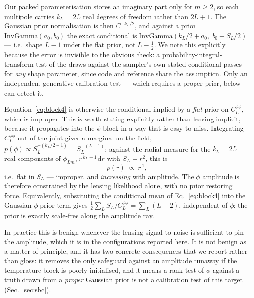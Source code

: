 \documentclass[twocolumn,superscriptaddress,aps,prl,floatfix]{revtex4-2}
\newcommand{\clpp}{C_L^{\phi\phi}}
\begin{document}
Our packed parameterisation stores an imaginary part only for $m \ge 2$, so
each multipole carries $k_L = 2L$ real degrees of freedom rather than $2L+1$.
The Gaussian prior normalisation is then $C^{-k_L/2}$, and against a prior
$\mathrm{InvGamma}(a_0, b_0)$ the exact conditional is
$\mathrm{InvGamma}(k_L/2 + a_0,\; b_0 + S_L/2)$ --- i.e.\ shape $L-1$ under the
flat prior, not $L-\tfrac12$. We note this explicitly because the error is
invisible to the obvious check: a probability-integral-transform test of the
draws against the sampler's own stated conditional passes for \emph{any} shape
parameter, since code and reference share the assumption. Only an independent
generative calibration test --- which requires a proper prior, below --- can
detect it.

Equation~\eqref{eq:block4} is otherwise the conditional implied by a
\emph{flat} prior on $\clpp$, which is improper. This is worth stating explicitly rather than
leaving implicit, because it propagates into the $\phi$ block in a way that is
easy to miss. Integrating $\clpp$ out of the joint gives a marginal on the
field, $p(\phi) \propto S_L^{-(k_L/2 - 1)} = S_L^{-(L-1)}$; against the radial
measure for the $k_L = 2L$ real components of $\phi_{Lm}$,
$r^{\,k_L - 1}\,\mathrm{d}r$ with $S_L = r^2$, this is
\begin{equation}
  p(r) \;\propto\; r^{\,1} ,
\end{equation}
i.e.\ flat in $S_L$ --- improper, and \emph{increasing} with amplitude. The
$\phi$ amplitude is therefore constrained by the lensing likelihood alone, with
no prior restoring force. Equivalently, substituting the conditional mean of
Eq.~\eqref{eq:block4} into the Gaussian $\phi$ prior term gives
$\tfrac12 \sum_L S_L/\clpp = \sum_L (L - 2)$, independent of $\phi$: the
prior is exactly scale-free along the amplitude ray.

In practice this is benign whenever the lensing signal-to-noise is sufficient
to pin the amplitude, which it is in the configurations reported here. It is
not benign as a matter of principle, and it has two concrete consequences that
we report rather than gloss: it removes the only safeguard against an
amplitude runaway if the temperature block is poorly initialised, and it means
a rank test of $\phi$ against a truth drawn from a \emph{proper} Gaussian prior
is not a calibration test of this target (Sec.~\ref{sec:sbc}).
\end{document}
